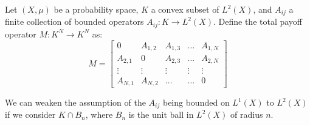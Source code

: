 \begin{definition}
  Let $(X,\mu)$ be a probability space, $K$ a convex subset of $L^2(X)$, and $A_{ij}$ a finite collection of bounded operators $A_{ij}: K \to L^2(X)$. Define the total payoff operator $M:K^N \to K^N$ as:
  \begin{equation}
    M =
    \begin{bmatrix}
        0 & A_{1,2} & A_{1,3} &\dots & A_{1,N} \\
        A_{2,1} & 0 & A_{2,3} &\dots & A_{2,N} \\
        \vdots & \vdots & \vdots & \vdots & \vdots \\
        A_{N,1} & A_{N,2} & \dots & \dots & 0
    \end{bmatrix}
  \end{equation}
\end{definition}
\begin{remark}
  We can weaken the assumption of the $A_{ij}$ being bounded on $L^1(X)$ to $L^2(X)$ if we consider $K\cap B_n$, where $B_n$ is the unit ball in $L^2(X)$ of radius $n$.
\end{remark}




